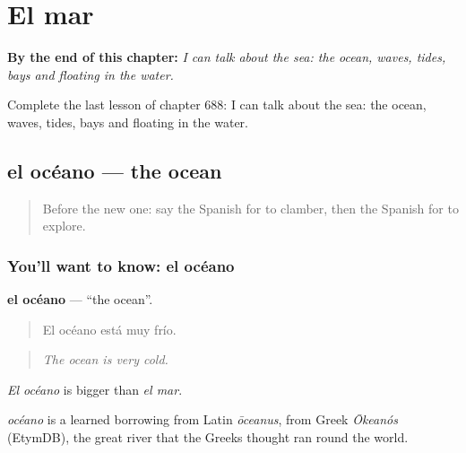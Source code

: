 
\chapter{El mar}
\label{ch:es-el-mar}

\begin{chapteropening}
\textbf{By the end of this chapter:} \emph{I can talk about the sea: the ocean, waves, tides, bays and floating in the water.}

Complete the last lesson of chapter 688: I can talk about the sea: the ocean, waves, tides, bays and floating in the water.
\end{chapteropening}

\section[el océano]{el océano — the ocean}

\label{lesson:ES-C688-oceano}



\begin{quote}
Before the new one: say the Spanish for to clamber, then the Spanish for to explore.
\end{quote}

\subsection*{You'll want to know: el océano}
\textbf{el océano} — \textquotedblleft{}the ocean\textquotedblright{}.

\begin{quote}
El océano está muy frío.
\end{quote}

\begin{quote}
\emph{The ocean is very cold.}
\end{quote}

\emph{El océano} is bigger than \emph{el mar}.

\begin{cousinweb}
\emph{océano} is a learned borrowing from Latin \emph{ōceanus}, from Greek \emph{Ōkeanós} (EtymDB), the great river that the Greeks thought ran round the world.
\end{cousinweb}

